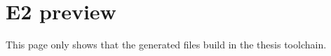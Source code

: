 \documentclass[11pt]{article}
\begin{document}
\section*{E2 preview}

This page only shows that the generated files build in the thesis toolchain.





\end{document}
